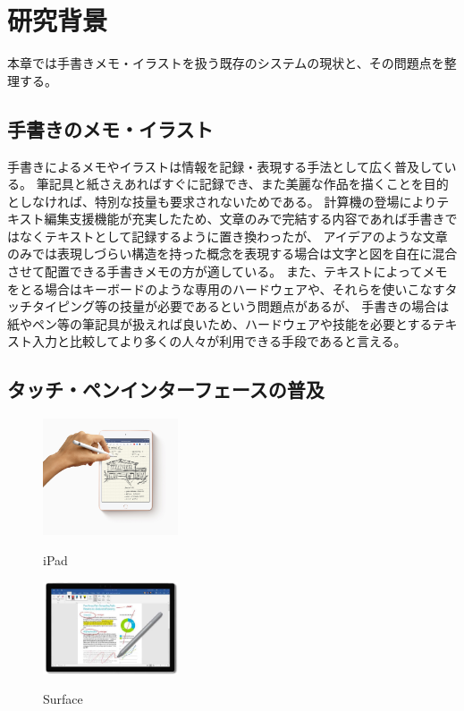 \chapter{研究背景}
\label{chap:haikei}

本章では手書きメモ・イラストを扱う既存のシステムの現状と、その問題点を整理する。

\newpage

\section{手書きのメモ・イラスト}
手書きによるメモやイラストは情報を記録・表現する手法として広く普及している。
筆記具と紙さえあればすぐに記録でき、また美麗な作品を描くことを目的としなければ、特別な技量も要求されないためである。
計算機の登場によりテキスト編集支援機能が充実したため、文章のみで完結する内容であれば手書きではなくテキストとして記録するように置き換わったが、
アイデアのような文章のみでは表現しづらい構造を持った概念を表現する場合は文字と図を自在に混合させて配置できる手書きメモの方が適している。
また、テキストによってメモをとる場合はキーボードのような専用のハードウェアや、それらを使いこなすタッチタイピング等の技量が必要であるという問題点があるが、
手書きの場合は紙やペン等の筆記具が扱えれば良いため、ハードウェアや技能を必要とするテキスト入力と比較してより多くの人々が利用できる手段であると言える。

\section{タッチ・ペンインターフェースの普及}

\begin{figure}[htbp] \begin{minipage}{0.5\hsize}
                         \begin{center} {\includegraphics[width=40mm]{images/ipadmini.jpg}}
                         \end{center} \caption{iPad}
\end{minipage} \begin{minipage}{0.5\hsize}
                   \begin{center} {\includegraphics[width=40mm]{images/surface.jpg}}
                   \end{center} \caption{Surface}
\end{minipage}
\end{figure}

